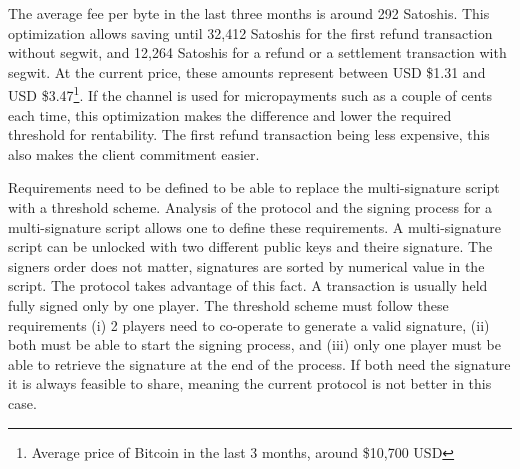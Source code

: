 The average fee per byte in the last three months is around 292 Satoshis. This
optimization allows saving until 32,412 Satoshis for the first refund
transaction without \gls{segwit}, and 12,264 Satoshis for a refund or a
settlement transaction with \gls{segwit}. At the current price, these amounts
represent between USD \$1.31 and USD \$3.47\footnote{ Average price of Bitcoin
in the last 3 months, around \$10,700 USD}. If the channel is
used for micropayments such as a couple of cents each time, this optimization
makes the difference and lower the required threshold for rentability. The first
refund transaction being less expensive, this also makes the client commitment
easier.

Requirements need to be defined to be able to replace the multi-signature script
with a threshold scheme. Analysis of the protocol and the signing process for a
multi-signature script allows one to define these requirements. A multi-signature
script can be unlocked with two different public keys and theire signature. The
signers order does not matter, signatures are sorted by numerical value in the script.
The protocol takes advantage of this fact. A transaction is usually held fully signed
only by one player. The threshold scheme must follow these requirements (i) 2
players need to co-operate to generate a valid signature, (ii) both must be able
to start the signing process, and (iii) only one player must be able to retrieve
the signature at the end of the process. If both need the signature it is
always feasible to share, meaning the current protocol is not better in this case.


